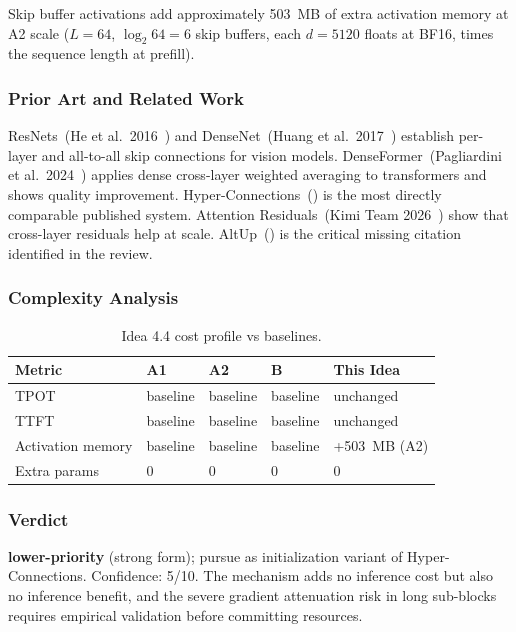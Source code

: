 \documentclass[11pt]{article}
\begin{document}
Skip buffer activations add approximately 503~MB of extra activation memory at A2 scale ($L{=}64$, $\log_2 64 {=} 6$ skip buffers, each $d{=}5120$ floats at BF16, times the sequence length at prefill).

\subsubsection*{Prior Art and Related Work}

ResNets~(He et al.\ 2016~\cite{HeResNet2016}) and DenseNet~(Huang et al.\ 2017~\cite{HuangDenseNet2017}) establish per-layer and all-to-all skip connections for vision models. DenseFormer~(Pagliardini et al.\ 2024~\cite{Pagliardini2024DenseFormer}) applies dense cross-layer weighted averaging to transformers and shows quality improvement. Hyper-Connections~(\cite{SunHyperConnections2024}) is the most directly comparable published system. Attention Residuals~(Kimi Team 2026~\cite{KimiAttentionResiduals2026}) show that cross-layer residuals help at scale. AltUp~(\cite{BaykalAltUp2023}) is the critical missing citation identified in the review.

\subsubsection*{Complexity Analysis}

\begin{table}[h]
\centering
\caption{Idea 4.4 cost profile vs baselines.}
\small
\begin{tabular}{lllll}
\toprule
Metric & A1 & A2 & B & This Idea \\
\midrule
TPOT & baseline & baseline & baseline & unchanged \\
TTFT & baseline & baseline & baseline & unchanged \\
Activation memory & baseline & baseline & baseline & +503~MB (A2) \\
Extra params & 0 & 0 & 0 & 0 \\
\bottomrule
\end{tabular}
\end{table}

\subsubsection*{Verdict}

\noindent\textbf{lower-priority} (strong form); pursue as initialization variant of Hyper-Connections. Confidence: 5/10. The mechanism adds no inference cost but also no inference benefit, and the severe gradient attenuation risk in long sub-blocks requires empirical validation before committing resources.
\end{document}

